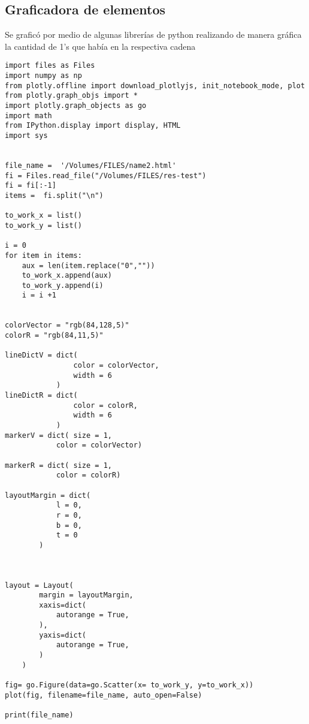\documentclass[a4paper]{article}
\begin{document}
            \subsection{Graficadora de elementos}
            Se graficó por medio de algunas librerías de python realizando de manera gráfica la cantidad de 1's que había en la respectiva cadena
            \begin{lstlisting}
import files as Files
import numpy as np
from plotly.offline import download_plotlyjs, init_notebook_mode, plot
from plotly.graph_objs import *
import plotly.graph_objects as go
import math
from IPython.display import display, HTML
import sys


file_name =  '/Volumes/FILES/name2.html'
fi = Files.read_file("/Volumes/FILES/res-test")  
fi = fi[:-1]
items =  fi.split("\n")

to_work_x = list()
to_work_y = list()

i = 0
for item in items:
    aux = len(item.replace("0",""))
    to_work_x.append(aux)
    to_work_y.append(i)
    i = i +1


colorVector = "rgb(84,128,5)"
colorR = "rgb(84,11,5)"

lineDictV = dict( 
                color = colorVector,
                width = 6
            )
lineDictR = dict( 
                color = colorR,
                width = 6
            )
markerV = dict( size = 1,
            color = colorVector)

markerR = dict( size = 1,
            color = colorR)

layoutMargin = dict( 
            l = 0,
            r = 0,
            b = 0,
            t = 0
        )



layout = Layout(
        margin = layoutMargin,
        xaxis=dict(
            autorange = True,
        ),
        yaxis=dict(
            autorange = True,
        )
    )  

fig= go.Figure(data=go.Scatter(x= to_work_y, y=to_work_x))
plot(fig, filename=file_name, auto_open=False)

print(file_name)

            \end{lstlisting}
                
\end{document}
